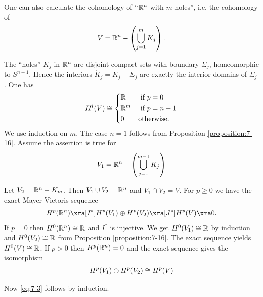 \begin{example}\label{example:7-18}
  One can also calculate the cohomology of ``$\mathbb{R}^n$ with $m$ holes'', i.e. the cohomology of
  \begin{align*}
    V = \mathbb{R}^n - \left(\bigcup_{j=1}^m K_j\right).
  \end{align*}

  The ``holes'' $K_j$ in $\mathbb{R}^n$ are disjoint compact sets with boundary $\Sigma_j$, homeomorphic
  to $S^{n-1}$. Hence the interiors $\mathring{K}_j = K_j - \Sigma_j$ are exactly the interior 
  domains of $\Sigma_j$. One has
  \begin{align}\label{eq:7-3}
    H^l(V) \cong \left\{\begin{aligned}
      & \mathbb{R} && \text{ if } p = 0 \\
      & \mathbb{R}^m && \text{ if } p = n-1 \\
      & 0 && \text{otherwise}.
    \end{aligned}\right.
  \end{align}
  We use induction on $m$. The case $n = 1$ follows from Proposition \ref{proposition:7-16}. Assume
  the assertion is true for 
  \begin{align*}
    V_1 = \mathbb{R}^n - \left(\bigcup_{j=1}^{m-1} K_j\right)
  \end{align*}

  Let $V_2 = \mathbb{R}^n -K_m$. Then $V_1\cup V_2 = \mathbb{R}^n$ and $V_1\cap V_2=V$. For $p\ge 0$ we have 
  the exact Mayer-Vietoris sequence
  \begin{align*}
    H^p(\RR^n) \xra[I^*] H^p(V_1)\oplus H^p(V_2) \xra[J^*] H^p(V) \xra 0.
  \end{align*}
  If $p=0$ then $H^0(\mathbb{R}^n)\cong \mathbb{R}$ and $I^*$ is injective. We get $H^0(V_1)\cong\mathbb{R}$ by 
  induction and $H^0(V_2)\cong \mathbb{R}$ from Proposition \ref{proposition:7-16}. The exact sequence
  yields $H^0(V)\cong \mathbb{R}$. If $p> 0$ then $H^p(\mathbb{R}^n) = 0$ and the exact sequence gives the 
  isomorphism 
  \begin{align*}
    H^p(V_1)\oplus H^p(V_2) \cong H^p(V)
  \end{align*}

  Now \eqref{eq:7-3} follows by induction.
\end{example}